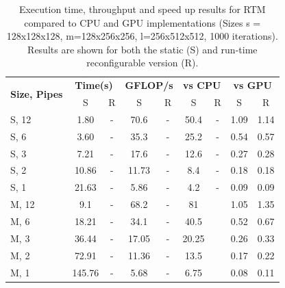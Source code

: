 \begin{table}[!h]
  \renewcommand{\arraystretch}{1.1}
  \centering
  \caption{Execution time, throughput and speed up results for RTM compared to CPU and GPU
    implementations (Sizes s = 128x128x128, m=128x256x256,
    l=256x512x512, 1000 iterations). Results are shown for both the static (S) and run-time reconfigurable version (R).}
  \label{speedup}
  \begin{tabular}{p{1cm}|cc|cc|cc|cc}
    \hline
    \multirow{2}{*}{\bf{Size, Pipes} }           &
    \multicolumn{2}{c|}{\bf{Time(s)}} & \multicolumn{2}{c|}{\bf{GFLOP/s}} &
    \multicolumn{2}{c|}{\bf{vs CPU}}  & \multicolumn{2}{c}{\bf{vs GPU}}                                                      \\
                                      &                               S      & R & S     & R & S     & R & S    & R    \\\hline \hline
    S, 12                                                              & 1.80   & - & 70.6  & - & 50.4  & - & 1.09 & 1.14 \\
    S, 6                                                                 & 3.60   & - & 35.3  & - & 25.2  & - & 0.54 & 0.57 \\
    S, 3                                                                 & 7.21   & - & 17.6  & - & 12.6  & - & 0.27 & 0.28 \\
    S, 2                                                                 & 10.86  & - & 11.73 & - & 8.4   & - & 0.18 & 0.18 \\
    S, 1                                                                 & 21.63  & - & 5.86  & - & 4.2   & - & 0.09 & 0.09 \\ \hline
    M, 12                                                               & 9.1    & - & 68.2  & - & 81    &   & 1.05 & 1.35 \\
    M, 6                                                                 & 18.21  & - & 34.1  & - & 40.5  &   & 0.52 & 0.67 \\
    M, 3                                                                 & 36.44  & - & 17.05 & - & 20.25 &   & 0.26 & 0.33 \\
    M, 2                                                                 & 72.91  & - & 11.36 & - & 13.5  &   & 0.17 & 0.22 \\
    M, 1                                                                 & 145.76 & - & 5.68  & - & 6.75  &   & 0.08 & 0.11 \\ \hline

\end{tabular}
\end{table}
